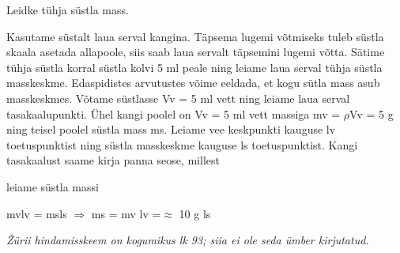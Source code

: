 
Leidke tühja süstla mass.

\hint

\solu
Kasutame süstalt laua serval kangina. Täpsema lugemi võtmiseks tuleb süstla skaala asetada allapoole, siis saab laua servalt täpsemini lugemi võtta. Sätime tühja süstla korral süstla kolvi 5 ml peale ning leiame laua serval tühja süstla masskeskme. Edaspidistes arvutustes võime eeldada, et kogu sütla mass asub masskeskmes. Võtame süstlasse Vv = 5 ml vett ning leiame laua serval tasakaalupunkti. Ühel kangi poolel on Vv = 5 ml vett massiga mv = $\rho$Vv = 5 g ning teisel poolel süstla mass ms. Leiame vee keskpunkti kauguse lv toetuspunktist ning süstla masskeskme kauguse ls toetuspunktist. Kangi tasakaalust saame kirja panna seose, millest

leiame süstla massi

mvlv = msls $\Rightarrow$ ms = mv lv =$\approx$ 10 g ls

\textit{Žürii hindamisskeem on kogumikus lk 93; siia ei ole seda ümber kirjutatud.}
\probend
